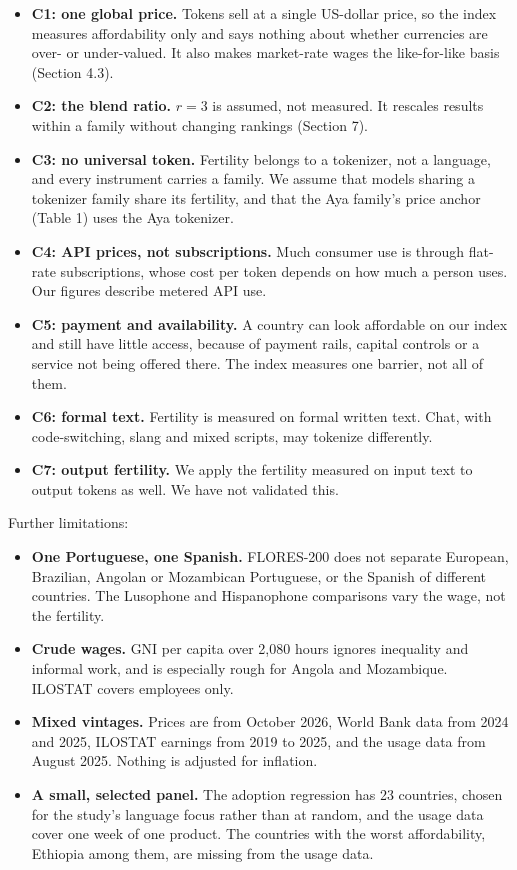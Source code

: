 \documentclass[11pt]{article}
\providecommand{\tightlist}{\setlength{\itemsep}{0pt}\setlength{\parskip}{0pt}}
\begin{document}
\begin{itemize}
\tightlist
\item
  \textbf{C1: one global price.} Tokens sell at a single US-dollar price, so the index measures affordability only and says nothing about whether currencies are over- or under-valued. It also makes market-rate wages the like-for-like basis (Section 4.3).
\item
  \textbf{C2: the blend ratio.} \(r = 3\) is assumed, not measured. It rescales results within a family without changing rankings (Section 7).
\item
  \textbf{C3: no universal token.} Fertility belongs to a tokenizer, not a language, and every instrument carries a family. We assume that models sharing a tokenizer family share its fertility, and that the Aya family's price anchor (Table 1) uses the Aya tokenizer.
\item
  \textbf{C4: API prices, not subscriptions.} Much consumer use is through flat-rate subscriptions, whose cost per token depends on how much a person uses. Our figures describe metered API use.
\item
  \textbf{C5: payment and availability.} A country can look affordable on our index and still have little access, because of payment rails, capital controls or a service not being offered there. The index measures one barrier, not all of them.
\item
  \textbf{C6: formal text.} Fertility is measured on formal written text. Chat, with code-switching, slang and mixed scripts, may tokenize differently.
\item
  \textbf{C7: output fertility.} We apply the fertility measured on input text to output tokens as well. We have not validated this.
\end{itemize}

Further limitations:

\begin{itemize}
\tightlist
\item
  \textbf{One Portuguese, one Spanish.} FLORES-200 does not separate European, Brazilian, Angolan or Mozambican Portuguese, or the Spanish of different countries. The Lusophone and Hispanophone comparisons vary the wage, not the fertility.
\item
  \textbf{Crude wages.} GNI per capita over 2,080 hours ignores inequality and informal work, and is especially rough for Angola and Mozambique. ILOSTAT covers employees only.
\item
  \textbf{Mixed vintages.} Prices are from October 2026, World Bank data from 2024 and 2025, ILOSTAT earnings from 2019 to 2025, and the usage data from August 2025. Nothing is adjusted for inflation.
\item
  \textbf{A small, selected panel.} The adoption regression has 23 countries, chosen for the study's language focus rather than at random, and the usage data cover one week of one product. The countries with the worst affordability, Ethiopia among them, are missing from the usage data.
\end{itemize}
\end{document}
